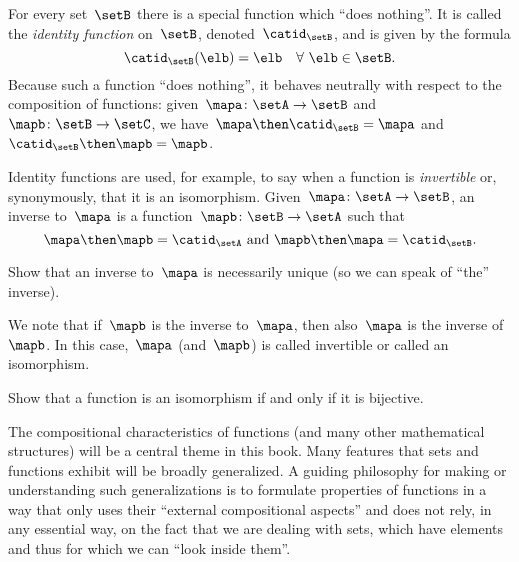 For every set~$\setB$ there is a special function which ``does nothing''.
It is called the \emph{identity function} on~$\setB$, denoted~$\catid_\setB$, and is given by the formula
\begin{equation*}
    \catid_\setB(\elb) = \elb \quad \forall \ \elb \in \setB.
\end{equation*}
Because such a function ``does nothing'', it behaves neutrally with respect to the composition of functions: given~$\mapa \colon \setA \to \setB$ and~$\mapb \colon \setB \to \setC$, we have~$\mapa \then \catid_\setB = \mapa$ and~$\catid_\setB \then \mapb = \mapb$.

Identity functions are used, for example, to say when a function is \emph{invertible} or, synonymously, that it is an isomorphism.
Given~$\mapa \colon \setA \to \setB$, an inverse to~$\mapa$ is a function~$\mapb \colon \setB \to \setA$ such that
\begin{equation}
    \label{eq:isomorphism-equations}
    \mapa \then \mapb = \catid_\setA \text{ and }  \mapb \then \mapa = \catid_\setB.
\end{equation}
%

\begin{exercise}
    Show that an inverse to~$\mapa$ is necessarily unique (so we can speak of ``the'' inverse).
\end{exercise}
\begin{solution}
\end{solution}
We note that if~$\mapb$ is the inverse to~$\mapa$, then also~$\mapa$ is the inverse of~$\mapb$.
In this case,~$\mapa$ (and~$\mapb$) is called invertible or called an isomorphism.

\begin{exercise}
    \label{ex:bijective-functions-are-isomorphisms}
    Show that a function is an isomorphism if and only if it is bijective.
\end{exercise}
\begin{solution}
\end{solution}

The compositional characteristics of functions (and many other mathematical structures) will be a central theme in this book.
Many features that sets and functions exhibit will be broadly generalized.
A guiding philosophy for making or understanding such generalizations is to formulate properties of functions in a way that only uses their ``external compositional aspects'' and does not rely, in any essential way, on the fact that we are dealing with sets, which have elements and thus for which we can ``look inside them''.

